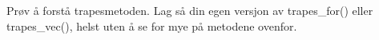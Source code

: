 %
%
Prøv å forstå trapesmetoden. Lag så din egen versjon av trapes\_{}for() eller trapes\_{}vec(), helst uten å se for mye på metodene ovenfor.
